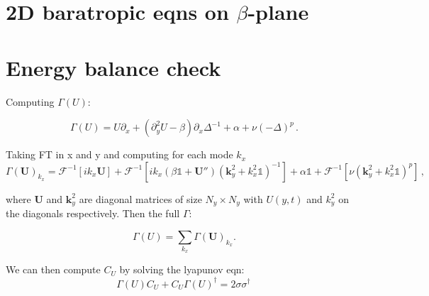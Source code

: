 \documentclass[12pt]{amsart}
\begin{document}
\section{2D baratropic eqns on $\beta$-plane}

\section{Energy balance check}

Computing $\Gamma(U)$:

\begin{equation*}
  \Gamma(U) = U\partial_x +(\partial_y^2 U-\beta)\partial_x \Delta^{-1} + \alpha + \nu(-\Delta)^p\,.
\end{equation*}

Taking FT in x and y and computing for each mode $k_{x}$
\begin{equation*}
  \Gamma(\mathbf{U})_{k_{x}} = \mathcal F^{-1}[ik_{x}\mathbf{U}] + \mathcal F^{-1}[ik_{x}(\beta\mathbb{1} + \mathbf{U}'') (\mathbf{k}_{y}^{2}  +k_{x}^{2} \mathbb{1}) ^{-1}] + \alpha \mathbb{1} + \mathcal F^{-1}[\nu(\mathbf{k}_{y}^{2} + k_{x}^{2}\mathbb{1})^p]\,,
\end{equation*}

where $\mathbf{U}$ and $\mathbf{k}_{y}^{2}$ are diagonal matrices of size $ N_{y} \times N_{y}$ with $U(y,t)$ and $k_{y}^2$ on the diagonals respectively. Then the full $\Gamma$:

\begin{equation*}
  \Gamma(U) = \sum_{k_{x}} \Gamma(\mathbf{U})_{k_{x}} .
\end{equation*}

We can then compute $C_{U}$ by solving the lyapunov eqn:
\begin{equation*}
  \Gamma(U) C_{U} + C_{U} \Gamma(U)^\dagger = 2
  \sigma \sigma^\dagger\,
\end{equation*}
\end{document}
